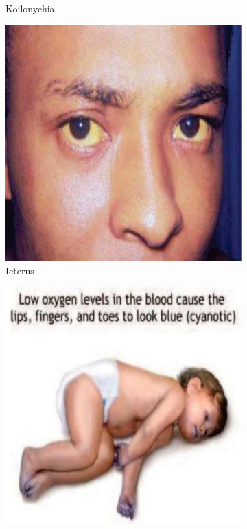 \documentclass[a4paper,12pt,openany,oneside]{book}
\begin{document}
{\begin{figure}[h]
\begin{subfigure}[t]{.23\textwidth}
																	\caption{Koilonychia}
																	\label{koilonychia}
																\end{subfigure}
																\hspace{\fill}
																\begin{subfigure}[t]{.23\textwidth}
																	\centering
																	\includegraphics[width=\textwidth]{./clinicalPhysioPic/jaundice.jpg}
																	\caption{Icterus}
																	\label{icterus}
																\end{subfigure}
																\hspace{\fill}
																\begin{subfigure}[t]{.23\textwidth}
																	\centering
																	\includegraphics[width=\textwidth]{./clinicalPhysioPic/cyanosis4-0.jpg}

\end{subfigure}
\end{figure}}
\end{document}
